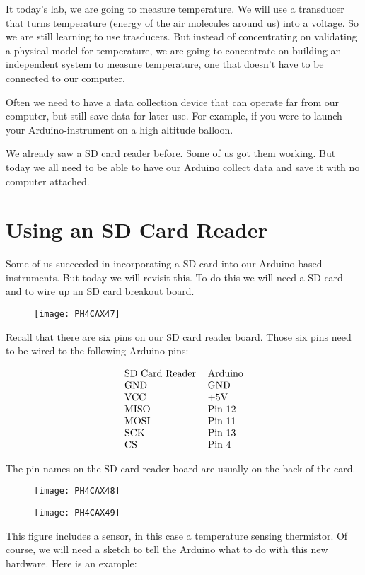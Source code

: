 It today's lab, we are going to measure temperature. We will use a
transducer that turns temperature (energy of the air molecules around us)
into a voltage. So we are still learning to use trasducers. But instead of
concentrating on validating a physical model for temperature, we are going
to concentrate on building an independent system to measure temperature, one
that doesn't have to be connected to our computer.

Often we need to have a data collection device that can operate far from our
computer, but still save data for later use. For example, if you were to
launch your Arduino-instrument on a high altitude balloon.

We already saw a SD card reader before. Some of us got them working. But
today we all need to be able to have our Arduino collect data and save it
with no computer attached.

\section{Using an SD Card Reader}

Some of us succeeded in incorporating a SD card into our Arduino based
instruments. But today we will revisit this. To do this we will need a SD
card and to wire up an SD card breakout board.\begin{figure}[h!]
\texttt{[image: PH4CAX47]}
\end{figure}Recall that there are six pins on
our SD card reader board. Those six pins need to be wired to the following
Arduino pins:

\begin{equation*}
\begin{tabular}{ll}
SD Card Reader & Arduino \\ 
GND & GND \\ 
VCC & +5V \\ 
MISO & Pin 12 \\ 
MOSI & Pin 11 \\ 
SCK & Pin 13 \\ 
CS & Pin 4%
\end{tabular}%
\end{equation*}

The pin names on the SD card reader board are usually on the back of the
card.\begin{figure}[h!]
\texttt{[image: PH4CAX48]}
\end{figure} \begin{figure}[h!]
\texttt{[image: PH4CAX49]}
\end{figure}This figure includes a sensor, in
this case a temperature sensing thermistor. Of course, we will need a sketch
to tell the Arduino what to do with this new hardware. Here is an example:


